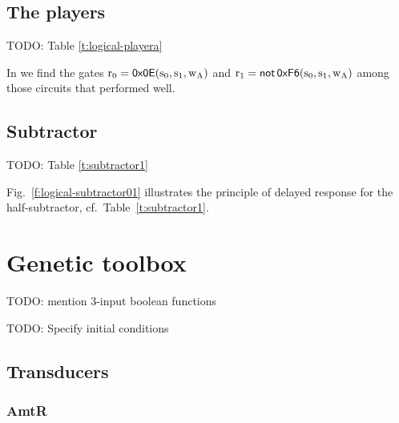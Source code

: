 \documentclass[12pt,notitlepage]{article}
\newcommand{\TODO}[1]{\textrm{\color{red}TODO: #1}}
\newcommand{\NOT}{\ensuremath{\mathop{\mathsf{not}}}\xspace}
\begin{document}
\subsection{The players}

\TODO{Table \ref{t:logical-playera}}

In
\cite{NielsenETAL2016}
we find the gates
$
	\ce{r_0} = 
	\mathop{\mathsf{0x0E}}
	(\ce{s_0}, \ce{s_1}, \ce{w_A})
$
and
$
	\ce{r_1} =
	\NOT
	\mathop{\mathsf{0xF6}}
	(\ce{s_0}, \ce{s_1}, \ce{w_A})
$
among those circuits that performed well.
%


%





\subsection{Subtractor} \label{s:sub}

\TODO{Table \ref{t:subtractor1}}








%
Fig.~\ref{f:logical-subtractor01}
illustrates the principle of delayed response
for the half-subtractor,
cf.~Table~\ref{t:subtractor1}.
%


\section{Genetic toolbox}


\TODO{mention 3-input boolean functions \cite{NielsenETAL2016}}

\TODO{Specify initial conditions}


\subsection{Transducers}


\subsubsection*{AmtR}
\end{document}
